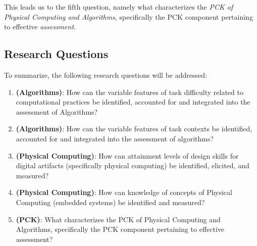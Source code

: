This leads us to the fifth question, namely what characterizes the \emph{PCK of Physical Computing and Algorithms}, specifically the PCK component pertaining to effective \emph{assessment}.








\subsection{Research Questions}


To summarize, the following research questions will be addressed:


\begin{enumerate}
\item \textbf{(Algorithms)}: How can the variable features of task difficulty related to computational practices be identified, accounted for and integrated into the assessment of Algorithms?
\item \textbf{(Algorithms)}: How can the variable features of task contexts be identified, accounted for and integrated into the assessment of algorithms?

\item \textbf{(Physical Computing)}: How can attainment levels of design skills for digital artifacts (specifically physical computing) be identified, elicited, and measured?
\item \textbf{(Physical Computing)}: How can knowledge of concepts of Physical Computing (embedded systems) be identified and measured?


\item \textbf{(PCK)}: What characterizes the PCK of Physical Computing and Algorithms, specifically the PCK component pertaining to effective assessment?

\end{enumerate}


